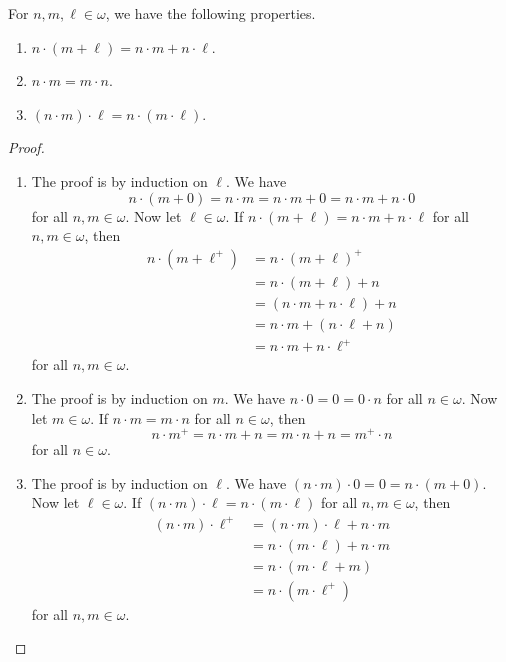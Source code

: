 \begin{theorem}
  For $n, m, \ell \in \omega$, we have the following properties.
  \begin{enumerate}
    \item $n \cdot (m + \ell) = n \cdot m + n \cdot \ell$.
    \item $n \cdot m = m \cdot n$.
    \item $(n \cdot m) \cdot \ell = n \cdot (m \cdot \ell)$.
  \end{enumerate}
\end{theorem}
\begin{proof}
  \leavevmode
  \begin{enumerate}
    \item The proof is by induction on $\ell$.
    We have
    \begin{equation*}
      n \cdot (m + 0)
      = n \cdot m
      = n \cdot m + 0
      = n \cdot m + n \cdot 0
    \end{equation*}
    for all $n, m \in \omega$.
    Now let $\ell \in \omega$.
    If $n \cdot (m + \ell) = n \cdot m + n \cdot \ell$ for all $n, m \in
    \omega$, then
    \begin{align*}
      n \cdot (m + \ell^+)
      &= n \cdot (m + \ell)^+ \\
      &= n \cdot (m + \ell) + n \\
      &= (n \cdot m + n \cdot \ell) + n \\
      &= n \cdot m + (n \cdot \ell + n) \\
      &= n \cdot m + n \cdot \ell^+
    \end{align*}
    for all $n, m \in \omega$.
    \item The proof is by induction on $m$.
    We have $n \cdot 0 = 0 = 0 \cdot n$ for all $n \in \omega$.
    Now let $m \in \omega$.
    If $n \cdot m = m \cdot n$ for all $n \in \omega$, then
    \begin{equation*}
      n \cdot m^+
      = n \cdot m + n
      = m \cdot n + n
      = m^+ \cdot n
    \end{equation*}
    for all $n \in \omega$.
    \item The proof is by induction on $\ell$.
    We have $(n \cdot m) \cdot 0 = 0 = n \cdot (m + 0)$.
    Now let $\ell \in \omega$.
    If $(n \cdot m) \cdot \ell = n \cdot (m \cdot \ell)$ for all $n, m \in
    \omega$, then
    \begin{align*}
      (n \cdot m) \cdot \ell^+
      &= (n \cdot m) \cdot \ell + n \cdot m \\
      &= n \cdot (m \cdot \ell) + n \cdot m \\
      &= n \cdot (m \cdot \ell + m) \\
      &= n \cdot (m \cdot \ell^+)
    \end{align*}
    for all $n, m \in \omega$.
    \qedhere
  \end{enumerate}
\end{proof}

